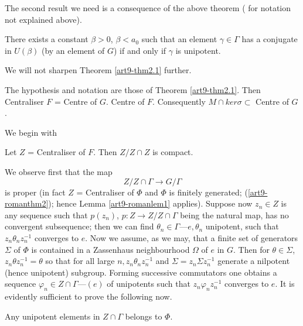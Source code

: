 The second result we need is a consequence of the above theorem ( for notation not explained above).

\begin{theorem}\label{art9-thm2.2}
There exists a constant $\beta > 0$, $\beta < a_0$ such that an element $\gamma \in \Gamma$ has a conjugate in $U (\beta)$ (by an element of $G$) if and only if $\gamma$ is unipotent.
\end{theorem}

We will not sharpen Theorem \ref{art9-thm2.1} further.

\begin{theorem}\label{art9-thm2.3}
The hypothesis and notation are those of Theorem \ref{art9-thm2.1}. Then Centraliser $F$ = Centre of $G$. Centre of $F$. Consequently $M \cap ker \sigma \subset$ Centre of $G$. 
\end{theorem}

We begin with 

\begin{claim}\label{art9-claim2.4}
Let $Z$ = Centraliser of $F$. Then $Z/Z \cap Z$ is compact.
\end{claim}

We observe first that the map
$$
Z/Z \cap \Gamma \to G/ \Gamma
$$
is proper (in fact $Z$ = Centraliser of $\Phi$ and $\Phi$ is finitely generated; (\ref{art9-romanthm2}); hence Lemma \ref{art9-romanlem1} applies). Suppose now $z_n \in Z$ is any sequence such that $p (z_n)$, $p: Z \to Z/Z \cap \Gamma$ being the natural map, has no convergent subsequence; then we can find $\theta_n \in\Gamma$---$e,\theta_n$ unipotent, such that $z_n \theta_n z_n^{-1}$ converges to $e$. Now we assume, as we  may, that a finite set of generators $\Sigma$ of $\Phi$ is contained in a Zassenhaus neighbourhood $\Omega$ of $e$ in $G$. Then for $\theta \in \Sigma$, $z_n \theta z_n^{-1}=\theta$ so that for all large $n, z_n \theta_n z^{-1}_n$  and $\Sigma = z_n \Sigma z^{-1}_n$ generate a nilpotent (hence unipotent) subgroup. Forming successive commutators one obtains a sequence $\varphi_n \in Z \cap \Gamma$---$(e)$ of unipotents such that $z_n \varphi_n z^{-1}_n$ converges to $e$. It is evidently sufficient to prove the following now.

\begin{assertion}\label{art9-asser2.5}
Any unipotent elements in $Z \cap \Gamma$ belongs to $\Phi$.
\end{assertion}

